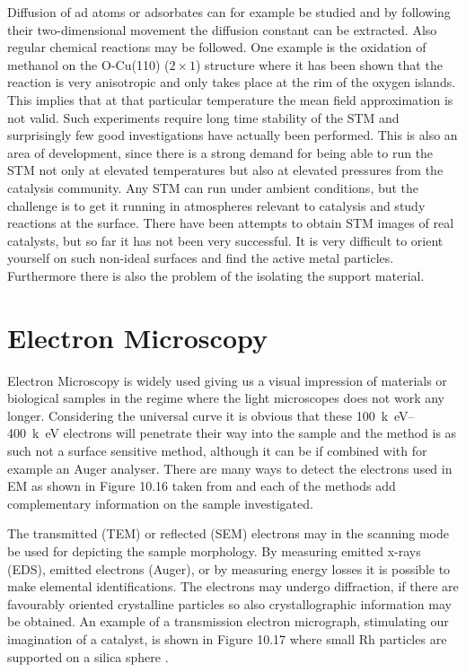 Diffusion of ad atoms or adsorbates can for example be studied and by following their two-dimensional movement the diffusion constant can be extracted. Also regular chemical reactions may be followed. One example is the oxidation of methanol on the O-Cu(110) ($2\times 1$) structure where it has been shown that the reaction is very anisotropic and only takes place at the rim of the oxygen islands. This implies that at that particular temperature the mean field approximation is not valid. Such experiments require long time stability of the STM and surprisingly few good investigations have actually been performed. This is also an area of development, since there is a strong demand for being able to run the STM not only at elevated temperatures but also at elevated pressures from the catalysis community. Any STM can run under ambient conditions, but the challenge is to get it running in atmospheres relevant to catalysis and study reactions at the surface. There have been attempts to obtain STM images of real catalysts, but so far it has not been very successful. It is very difficult to orient yourself on such non-ideal surfaces and find the active metal particles. Furthermore there is also the problem of the isolating the support material.

\section{Electron Microscopy}
Electron Microscopy is widely used giving us a visual impression of materials or biological samples in the regime where the light microscopes does not work any longer. Considering  the universal curve  it is obvious that these \SIrange{100}{400}{k\electronvolt} electrons will penetrate their way into the sample and the method is as such not a surface sensitive method, although it can be if combined with for example an Auger analyser. There are many ways to detect the electrons used in EM as shown in Figure 10.16 taken from \cite{Niemantsverdriet} and each of the methods add complementary information on the sample investigated.  

\vspace*{11cm}


\vspace{1cm} 

The transmitted (TEM) or reflected (SEM) electrons may in the scanning mode be used for depicting the sample morphology. By measuring emitted x-rays (EDS), emitted electrons (Auger), or by measuring energy losses it is possible to make elemental identifications. The electrons may undergo diffraction, if there are favourably oriented crystalline particles so also crystallographic information may be obtained. An example  of a transmission electron micrograph, stimulating our imagination of a catalyst, is shown in Figure 10.17 where small Rh particles are supported on a silica sphere  \cite{Datye}.

